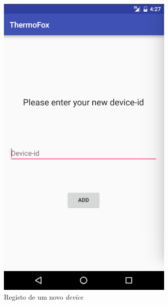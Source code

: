 \documentclass[a4paper]{article}
\begin{document}
\begin{figure}[H]
  \includegraphics[width=\linewidth]{addDev.png}
  \caption{Registo de um novo \textit{device}}\label{fig:addDev}
\endminipage\hfill
{}

\end{figure}
\end{document}
